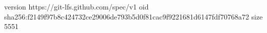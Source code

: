 version https://git-lfs.github.com/spec/v1
oid sha256:f2149f97b8c424732ce29006de793b5d0f81cac9f9221681d6147fdf70768a72
size 5551
